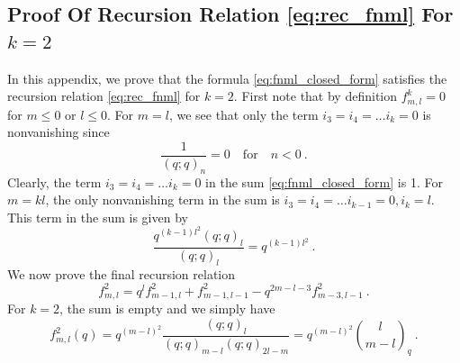 \documentclass[a4paper,10pt]{article}
\begin{document}
\begin{appendix}
\subsection{Proof Of Recursion Relation \eqref{eq:rec_fnml} For $k=2$}
In this appendix, we prove that the formula \eqref{eq:fnml_closed_form} satisfies the recursion relation \eqref{eq:rec_fnml} for $k=2$. First note that by definition $f^k_{m,l}=0$ for $m\leq 0$ or $l\leq 0$. For $m=l$, we see that only the term $i_3=i_4=\dots i_k=0$ is nonvanishing since 
\begin{equation}
    \frac{1}{(q;q)_n}=0 \quad\text{for}\quad n<0~.
\end{equation}
Clearly, the term $i_3=i_4=\dots i_k=0$ in the sum \eqref{eq:fnml_closed_form} is 1. For $m=kl$, the only nonvanishing term in the sum is $i_3=i_4=\dots i_{k-1}=0,i_k=l$. This term in the sum is given by 
\begin{equation}
    \frac{q^{(k-1)l^2}(q;q)_l}{(q;q)_l}=q^{(k-1)l^2}~.
\end{equation}
We now prove the final recursion relation
\begin{equation}
f^2_{m,l}=q^l f^{2}_{m-1,l} + f^{2}_{m-1,l-1}-q^{2m-l-3} f^{2}_{m-3,l-1}~.    
\end{equation}
For $k=2$, the sum is empty and we simply have 
\begin{equation}
f^2_{m,l}(q)=q^{(m-l)^2}\frac{(q;q)_{l}}{(q;q)_{m-l}(q;q)_{2l-m}}=q^{(m-l)^2}{l\choose m-l}_q~.    
\end{equation}

\end{appendix}
\end{document}
